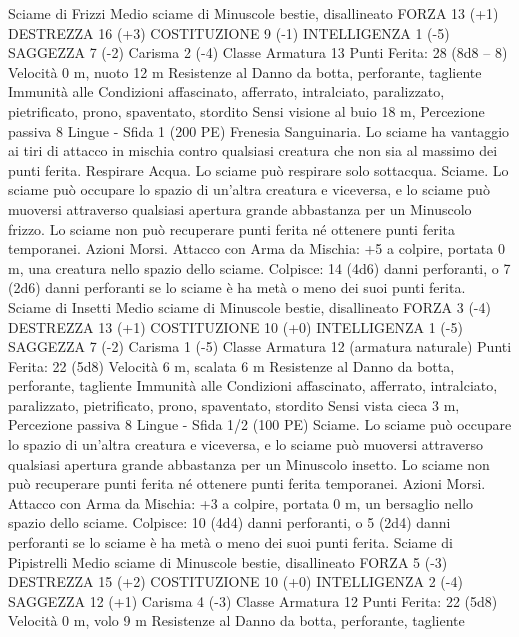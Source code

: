 \begin{multicols}{2}
Sciame di Frizzi
Medio sciame di Minuscole bestie, disallineato
FORZA 13 (+1)
DESTREZZA 16 (+3)
COSTITUZIONE 9 (-1)
INTELLIGENZA 1 (-5)
SAGGEZZA 7 (-2)
Carisma 2 (-4)
Classe Armatura 13
\hspace*{0pt}\hfill{Punti Ferita}: 28 (8d8 – 8)
Velocità 0 m, nuoto 12 m
Resistenze al Danno da botta, perforante, tagliente
Immunità alle Condizioni affascinato, afferrato, intralciato,
paralizzato, pietrificato, prono, spaventato, stordito
Sensi visione al buio 18 m, Percezione passiva 8
Lingue -
Sfida 1 (200 PE)
Frenesia Sanguinaria. Lo sciame ha vantaggio ai tiri di attacco
in mischia contro qualsiasi creatura che non sia al massimo dei
punti ferita.
Respirare Acqua. Lo sciame può respirare solo sottacqua.
Sciame. Lo sciame può occupare lo spazio di un’altra creatura e
viceversa, e lo sciame può muoversi attraverso qualsiasi apertura
grande abbastanza per un Minuscolo frizzo. Lo sciame non può
recuperare punti ferita né ottenere punti ferita temporanei.
Azioni
Morsi. Attacco con Arma da Mischia: +5 a colpire, portata 0 m,
una creatura nello spazio dello sciame.
Colpisce: 14 (4d6) danni perforanti, o 7 (2d6) danni perforanti se
lo sciame è ha metà o meno dei suoi punti ferita.
Sciame di Insetti
Medio sciame di Minuscole bestie, disallineato
FORZA 3 (-4)
DESTREZZA 13 (+1)
COSTITUZIONE 10 (+0)
INTELLIGENZA 1 (-5)
SAGGEZZA 7 (-2)
Carisma 1 (-5)
Classe Armatura 12 (armatura naturale)
\hspace*{0pt}\hfill{Punti Ferita}: 22 (5d8)
Velocità 6 m, scalata 6 m
Resistenze al Danno da botta, perforante, tagliente
Immunità alle Condizioni affascinato, afferrato, intralciato,
paralizzato, pietrificato, prono, spaventato, stordito
Sensi vista cieca 3 m, Percezione passiva 8
Lingue -
Sfida 1/2 (100 PE)
Sciame. Lo sciame può occupare lo spazio di un’altra creatura e
viceversa, e lo sciame può muoversi attraverso qualsiasi apertura
grande abbastanza per un Minuscolo insetto. Lo sciame non può
recuperare punti ferita né ottenere punti ferita temporanei.
Azioni
Morsi. Attacco con Arma da Mischia: +3 a colpire, portata 0 m,
un bersaglio nello spazio dello sciame.
Colpisce: 10 (4d4) danni perforanti, o 5 (2d4) danni perforanti se
lo sciame è ha metà o meno dei suoi punti ferita.
Sciame di Pipistrelli
Medio sciame di Minuscole bestie, disallineato
FORZA 5 (-3)
DESTREZZA 15 (+2)
COSTITUZIONE 10 (+0)
INTELLIGENZA 2 (-4)
SAGGEZZA 12 (+1)
Carisma 4 (-3)
Classe Armatura 12
\hspace*{0pt}\hfill{Punti Ferita}: 22 (5d8)
Velocità 0 m, volo 9 m
Resistenze al Danno da botta, perforante, tagliente

\end{multicols}
